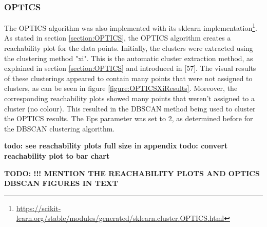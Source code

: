 \subsubsection{OPTICS}
The OPTICS algorithm was also implemented with its sklearn implementation\footnote{\url{https://scikit-learn.org/stable/modules/generated/sklearn.cluster.OPTICS.html}}. As stated in section \ref{section:OPTICS}, the OPTICS algorithm creates a reachability plot for the data points. Initially, the clusters were extracted using the clustering method "xi". This is the automatic cluster extraction method, as explained in section \ref{section:OPTICS} and introduced in \textcite{OPTICS}[57]. The visual results of these clusterings appeared to contain many points that were not assigned to clusters, as can be seen in figure \ref{figure:OPTICSXiResults}. Moreover, the corresponding reachability plots showed many points that weren't assigned to a cluster (no colour). This resulted in the DBSCAN method being used to cluster the OPTICS results. The Eps parameter was set to 2, as determined before for the DBSCAN clustering algorithm.

\textbf{todo: see reachability plots full size in appendix}
\textbf{todo: convert reachability plot to bar chart}

\textbf{TODO: !!! MENTION THE REACHABILITY PLOTS AND OPTICS DBSCAN FIGURES IN TEXT}

